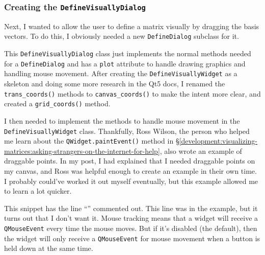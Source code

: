 \documentclass[../development.tex]{subfiles}
\begin{document}

\subsubsection{Creating the \texttt{DefineVisuallyDialog}\label{development:improving-the-gui:creating-the-DefineVisuallyDialog}}

Next, I wanted to allow the user to define a matrix visually by dragging the basis vectors. To do this, I obviously needed a new \texttt{DefineDialog} subclass for it.


This \texttt{DefineVisuallyDialog} class just implements the normal methods needed for a \texttt{DefineDialog} and has a \texttt{plot} attribute to handle drawing graphics and handling mouse movement. After creating the \texttt{DefineVisuallyWidget} as a skeleton and doing some more research in the Qt5 docs\cite{qt5-docs-qwidget-mousemoveevent}, I renamed the \texttt{trans\_coords()} methods to \texttt{canvas\_coords()} to make the intent more clear, and created a \texttt{grid\_coords()} method.


I then needed to implement the methods to handle mouse movement in the \texttt{DefineVisuallyWidget} class. Thankfully, Ross Wilson, the person who helped me learn about the \texttt{QWidget.paintEvent()} method in \S\ref{development:visualizing-matrices:asking-strangers-on-the-internet-for-help}, also wrote an example of draggable points\cite{gitlab-custom-widgets-ijvectors.py}. In my post, I had explained that I needed draggable points on my canvas, and Ross was helpful enough to create an example in their own time. I probably could've worked it out myself eventually, but this example allowed me to learn a lot quicker.


This snippet has the line \enquote{} commented out. This line was in the example, but it turns out that I don't want it. Mouse tracking means that a widget will receive a \texttt{QMouseEvent} every time the mouse moves. But if it's disabled (the default), then the widget will only receive a \texttt{QMouseEvent} for mouse movement when a button is held down at the same time.
\end{document}
